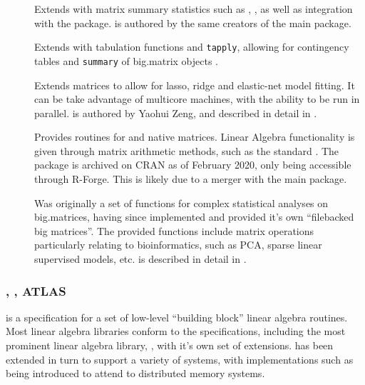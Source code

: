 \begin{description}
    \item[]
        Extends  with matrix summary statistics such as
        , , as well as integration with the 
        package\cite{emerson16}.  is authored by the same creators
        of the main  package.
    \item[]
        Extends  with tabulation functions and \texttt{tapply},
        allowing for contingency tables and \texttt{summary} of big.matrix
        objects \cite{kane16}.
    \item[]
        Extends  matrices to allow for lasso, ridge and elastic-net
        model fitting. It can be take advantage of multicore machines, with the
        ability to be run in parallel.  is authored by Yaohui Zeng, and
        described in detail in \textcite{zeng2017biglasso}.
    \item[]
        Provides  routines for  and native \R matrices. Linear
        Algebra functionality is given through matrix arithmetic methods, such
        as the standard . The package is archived
        on CRAN as of February 2020, only being accessible through R-Forge. This
        is likely due to a merger with the main  package.
    \item[]
        Was originally a set of functions for complex statistical analyses on
        big.matrices, having since implemented and provided it's own
        ``filebacked big matrices''\cite{prive2018efficient}. The provided
        functions include matrix operations particularly relating to
        bioinformatics, such as PCA, sparse linear supervised models, etc.
         is described in detail in \textcite{prive2018efficient}.
\end{description}

\subsubsection{, , ATLAS}\label{subsec:blas-lapack}

 is a specification for a set of low-level ``building block'' linear
algebra routines\cite{lawson1979basic}. Most linear algebra libraries
conform to the  specifications, including the most prominent linear
algebra library, , with it's own set of
extensions\cite{demmel1989lapack}.  has been extended in turn to
support a variety of systems, with implementations such as 
being introduced to attend to distributed memory
systems\cite{choi1992scalapack}.

